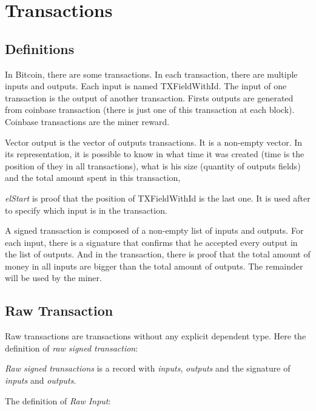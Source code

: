 \section{Transactions}

\subsection{Definitions}

In Bitcoin, there are some transactions.
In each transaction, there are multiple inputs and outputs.
Each input is named TXFieldWithId.
The input of one transaction is the output of another transaction.
Firsts outputs are generated from coinbase transaction (there is just one of this transaction at
each block).
Coinbase transactions are the miner reward.


Vector output is the vector of outputs transactions.
It is a non-empty vector.
In its representation, it is possible to know in what time it was created (time is the position of
they in all transactions),
what is his size (quantity of outputs fields)
and the total amount spent in this transaction,

\emph{elStart} is proof that the position of TXFieldWithId is the last one.
It is used after to specify which input is in the transaction.


A signed transaction is composed of a non-empty list of inputs and outputs.
For each input, there is a signature that confirms that he accepted every output in the list of outputs.
And in the transaction, there is proof that the total amount of money in all inputs are bigger than
the total amount of outputs.
The remainder will be used by the miner.

\subsection{Raw Transaction}

Raw transactions are transactions without any explicit dependent type.
Here the definition of \emph{raw signed transaction}:


\emph{Raw signed transactions} is a record with \emph{inputs}, \emph{outputs}
and the signature of \emph{inputs} and \emph{outputs}.

The definition of \emph{Raw Input}:

